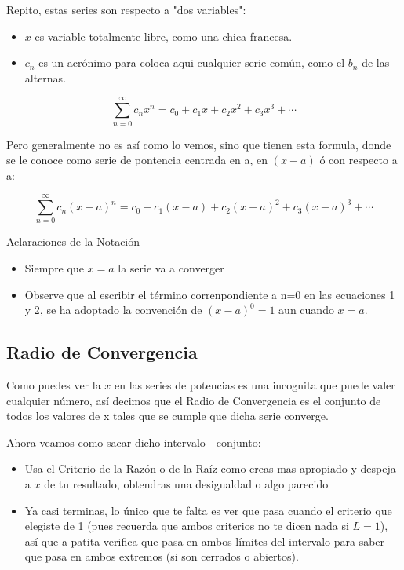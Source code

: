 \documentclass[12pt]{report}                                %
\begin{document}
        Repito, estas series son respecto a "dos variables":
        \begin{itemize}
            \item $x$ es variable totalmente libre, como una chica francesa.
            \item $c_n$ es un acrónimo para coloca aqui cualquier serie común, como el 
            $b_n$ de las alternas.
        \end{itemize}

        \begin{equation}
            \sum_{n=0}^{\infty} c_n x^n = c_0 + c_1x + c_2x^2 + c_3x^3 + \cdots
        \end{equation}

        Pero generalmente no es así como lo vemos, sino que tienen esta formula, 
        donde se le conoce como serie de pontencia centrada en a, en $(x-a)$ ó
        con respecto a a:

        \begin{equation}
            \sum_{n=0}^{\infty} c_n (x-a)^n = c_0 + c_1(x-a) + c_2(x-a)^2 + c_3(x-a)^3 + \cdots
        \end{equation}


        Aclaraciones de la Notación  
        \begin{itemize}
            \item Siempre que $x = a$ la serie va a converger
            \item Observe que al escribir el término correnpondiente a n=0 
                  en las ecuaciones 1 y 2, se ha adoptado la convención de
                  $(x-a)^0=1$ aun cuando $x=a$. 
        \end{itemize}


    \clearpage
    \subsection{Radio de Convergencia}
        Como puedes ver la $x$ en las series de potencias es una incognita que puede
        valer cualquier número, así decimos que el Radio de Convergencia es el conjunto de
        todos los valores de x tales que se cumple que dicha serie converge.

        Ahora veamos como sacar dicho intervalo - conjunto:

        \begin{itemize}
            \item Usa el Criterio de la Razón o de la Raíz como creas mas apropiado
            y despeja a $x$ de tu resultado, obtendras una desigualdad o algo parecido

            \item Ya casi terminas, lo único que te falta es ver que pasa cuando el 
            criterio que elegiste de 1 (pues recuerda que ambos criterios no te dicen nada
            si $L=1$), así que a patita verifica que pasa en ambos límites del intervalo para
            saber que pasa en ambos extremos (si son cerrados o abiertos). 
        \end{itemize}
\end{document}
